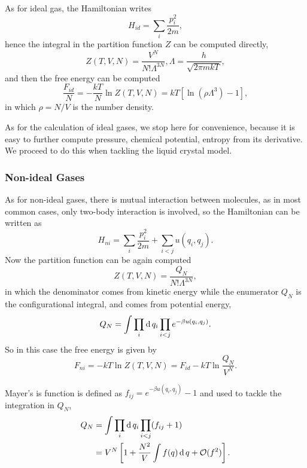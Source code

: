 As for ideal gas, the Hamiltonian writes
\begin{equation}
	H_{id}=\sum_i \frac{p_i^2}{2m},
\end{equation}
hence the integral in the partition function $Z$ can be computed directly,
\begin{equation}
	Z(T,V,N) = \frac{V^N}{N!\Lambda^{3N}}, \Lambda = \frac{h}{\sqrt{2\pi m kT}},
\end{equation}
and then the free energy can be computed
\begin{equation}
	\frac{F_{id}}{N}=-\frac{kT}{N}\ln Z(T,V,N) = kT\left[\ln (\rho\Lambda^3) - 1\right],
\end{equation}
in which $\rho = N/V$ is the number density.

As for the calculation of ideal gases, we stop here for convenience, because it is easy to further compute pressure, chemical potential, entropy from its derivative. We proceed to do this when tackling the liquid crystal model.

\subsubsection{Non-ideal Gases}
As for non-ideal gases, there is mutual interaction between molecules, as in most common cases, only two-body interaction is involved, so the Hamiltonian can be written as
\begin{equation}
	H_{ni}=\sum_i\frac{p_i^2}{2m}+\sum_{i<j}u(q_i,q_j).
\end{equation}
Now the partition function can be again computed
\begin{equation}
	Z(T,V,N) = \frac{Q_N}{N!\Lambda^{3N}},
\end{equation}
in which the denominator comes from kinetic energy while the enumerator $Q_N$ is the configurational integral, and comes from potential energy,
\begin{equation}
	Q_N = \int\prod_i\operatorname{d}q_i\prod_{i<j}e^{-\beta u(q_i,q_j)}.
\end{equation}
So in this case the free energy is given by
\begin{equation}
	F_{ni} = -kT\ln Z(T,V,N) = F_{id} - kT\ln\frac{Q_N}{V^N}.
\end{equation}

Mayer's is function is defined as $f_{ij} = e^{-\beta u(q_i,q_j)}-1$ and used to tackle the integration in $Q_N$,
\begin{equation}
	\begin{split}
		Q_N &= \int\prod_i\operatorname{d}q_i\prod_{i<j}(f_{ij}+1)\\
		&=V^N\left[1+\frac{N^2}{V}\int f(q)\operatorname{d}q+\mathcal{O}(f^2)\right].
	\end{split}
\end{equation}


